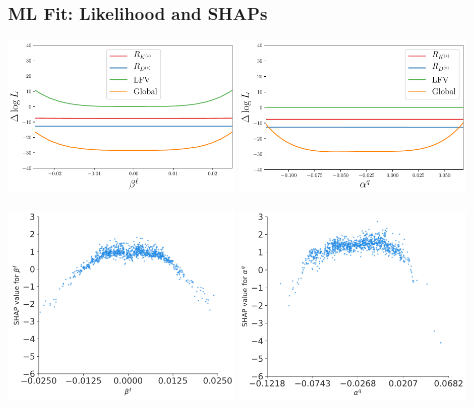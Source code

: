 \documentclass[mathserif, 10pt, dvipsnames]{beamer}
\begin{document}
\begin{frame}\frametitle{ML Fit: Likelihood and SHAPs}

\begin{center}
    \includegraphics[width=0.45\textwidth]{figures/evoplot_betal.pdf}
    \includegraphics[width=0.45\textwidth]{figures/evoplot_alphaq.pdf}   \end{center}
\begin{center}
    \includegraphics[width=0.45\textwidth]{figures/SHAP_bl.pdf}
    \includegraphics[width=0.45\textwidth]{figures/SHAP_aq.pdf}
\end{center}

\end{frame}
\end{document}
